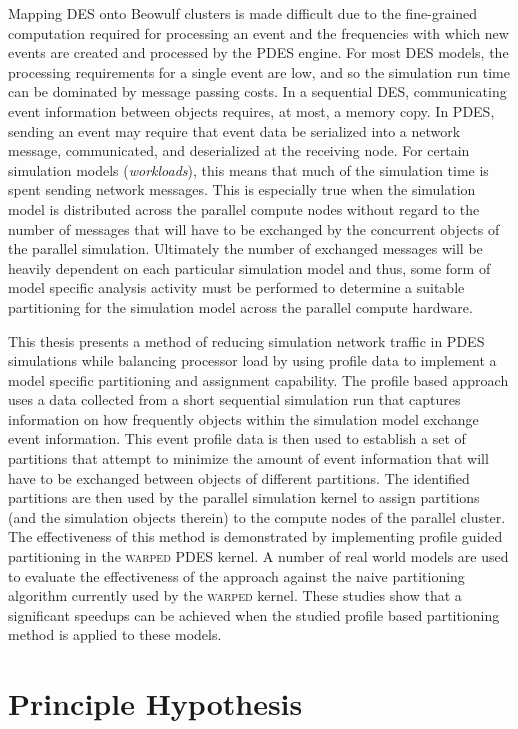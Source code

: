 \documentclass[11pt]{book}
\begin{document}
Mapping DES onto Beowulf clusters is made difficult due to the fine-grained computation required for processing an event and the frequencies with which new events are created and processed by the PDES engine. For most DES models, the processing requirements for a single event are low, and so the simulation run time can be dominated by message passing costs. In a sequential DES, communicating event information between objects requires, at most, a memory copy. In PDES, sending an event may require that event data be serialized into a network message, communicated, and deserialized at the receiving node. For certain simulation models (\emph{workloads}), this means that much of the simulation time is spent sending network messages. This is especially true when the simulation model is distributed across the parallel compute nodes without regard to the number of messages that will have to be exchanged by the concurrent objects of the parallel simulation. Ultimately the number of exchanged messages will be heavily dependent on each particular simulation model and thus, some form of model specific analysis activity must be performed to determine a suitable partitioning for the simulation model across the parallel compute hardware.

This thesis presents a method of reducing simulation network traffic in PDES simulations while balancing processor load by using profile data to implement a model specific partitioning and assignment capability. The profile based approach uses a data collected from a short sequential simulation run that captures information on how frequently objects within the simulation model exchange event information. This event profile data is then used to establish a set of partitions that attempt to minimize the amount of event information that will have to be exchanged between objects of different partitions. The identified partitions are then used by the parallel simulation kernel to assign partitions (and the simulation objects therein) to the compute nodes of the parallel cluster. The effectiveness of this method is demonstrated by implementing profile guided partitioning in the \textsc{warped} PDES kernel. A number of real world models are used to evaluate the effectiveness of the approach against the naive partitioning algorithm currently used by the \textsc{warped} kernel. These studies show that a significant speedups can be achieved when the studied profile based partitioning method is applied to these models.

\section{Principle Hypothesis}
\end{document}
